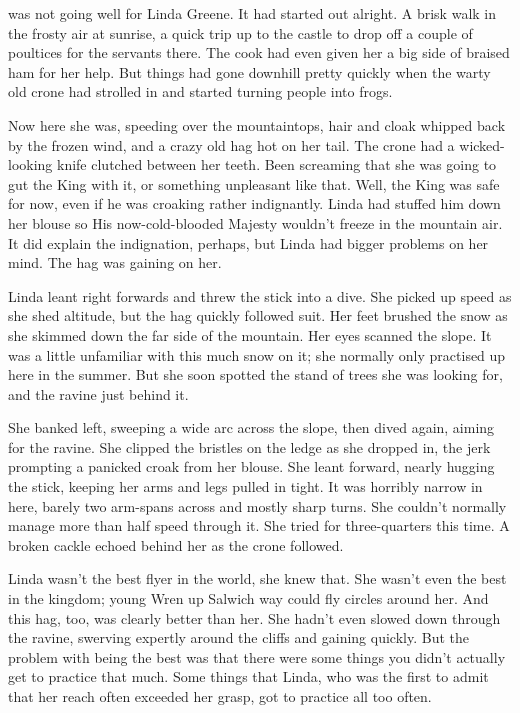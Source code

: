 
 was not going well for Linda Greene.
It had started out alright.
A brisk walk in the frosty air at sunrise, a quick trip up to the castle to drop off a couple of poultices for the servants there.
The cook had even given her a big side of braised ham for her help.
But things had gone downhill pretty quickly when the warty old crone had strolled in and started turning people into frogs.

Now here she was, speeding over the mountaintops, hair and cloak whipped back by the frozen wind, and a crazy old hag hot on her tail.
The crone had a wicked-looking knife clutched between her teeth.
Been screaming that she was going to gut the King with it, or something unpleasant like that.
Well, the King was safe for now, even if he was croaking rather indignantly.
Linda had stuffed him down her blouse so His now-cold-blooded Majesty wouldn't freeze in the mountain air.
It did explain the indignation, perhaps, but Linda had bigger problems on her mind.
The hag was gaining on her.

Linda leant right forwards and threw the stick into a dive.
She picked up speed as she shed altitude, but the hag quickly followed suit.
Her feet brushed the snow as she skimmed down the far side of the mountain.
Her eyes scanned the slope.
It was a little unfamiliar with this much snow on it; she normally only practised up here in the summer.
But she soon spotted the stand of trees she was looking for, and the ravine just behind it.

She banked left, sweeping a wide arc across the slope, then dived again, aiming for the ravine.
She clipped the bristles on the ledge as she dropped in, the jerk prompting a panicked croak from her blouse.
She leant forward, nearly hugging the stick, keeping her arms and legs pulled in tight.
It was horribly narrow in here, barely two arm-spans across and mostly sharp turns.
She couldn't normally manage more than half speed through it.
She tried for three-quarters this time.
A broken cackle echoed behind her as the crone followed.

Linda wasn't the best flyer in the world, she knew that.
She wasn't even the best in the kingdom; young Wren up Salwich way could fly circles around her.
And this hag, too, was clearly better than her.
She hadn't even slowed down through the ravine, swerving expertly around the cliffs and gaining quickly.
But the problem with being the best was that there were some things you didn't actually get to practice that much.
Some things that Linda, who was the first to admit that her reach often exceeded her grasp, got to practice all too often.

